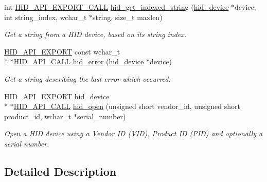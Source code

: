 \begin{DoxyCompactItemize}
int \hyperlink{osx_2hidapi_8h_a70c49eda5025c1bc455af77da19ca312}{H\-I\-D\-\_\-\-A\-P\-I\-\_\-\-E\-X\-P\-O\-R\-T\-\_\-\-C\-A\-L\-L} \hyperlink{group__API_ga03810bc0be3c21e9229feff689a9de85}{hid\-\_\-get\-\_\-indexed\-\_\-string} (\hyperlink{linux_2hidapi_8h_aa6da74d5686d198dd3e5440e60088fcc}{hid\-\_\-device} $\ast$device, int string\-\_\-index, wchar\-\_\-t $\ast$string, size\-\_\-t maxlen)
\begin{DoxyCompactList}\small\item\em Get a string from a H\-I\-D device, based on its string index. \end{DoxyCompactList}\item 
\hyperlink{osx_2hidapi_8h_aa60150016800ccb88fdf140e8553ae13}{H\-I\-D\-\_\-\-A\-P\-I\-\_\-\-E\-X\-P\-O\-R\-T} const wchar\-\_\-t \\*
$\ast$\hyperlink{osx_2hidapi_8h_af140a25716604e86096670a505a58ee0}{H\-I\-D\-\_\-\-A\-P\-I\-\_\-\-C\-A\-L\-L} \hyperlink{group__API_ga1b5c0ca1c785b8024f5eb46750a8f606}{hid\-\_\-error} (\hyperlink{linux_2hidapi_8h_aa6da74d5686d198dd3e5440e60088fcc}{hid\-\_\-device} $\ast$device)
\begin{DoxyCompactList}\small\item\em Get a string describing the last error which occurred. \end{DoxyCompactList}\item 
\hyperlink{osx_2hidapi_8h_aa60150016800ccb88fdf140e8553ae13}{H\-I\-D\-\_\-\-A\-P\-I\-\_\-\-E\-X\-P\-O\-R\-T} \hyperlink{linux_2hidapi_8h_aa6da74d5686d198dd3e5440e60088fcc}{hid\-\_\-device} \\*
$\ast$\hyperlink{osx_2hidapi_8h_af140a25716604e86096670a505a58ee0}{H\-I\-D\-\_\-\-A\-P\-I\-\_\-\-C\-A\-L\-L} \hyperlink{group__API_gabc0f2cd462ee003ce98d2ad3edfeb871}{hid\-\_\-open} (unsigned short vendor\-\_\-id, unsigned short product\-\_\-id, wchar\-\_\-t $\ast$serial\-\_\-number)
\begin{DoxyCompactList}\small\item\em Open a H\-I\-D device using a Vendor I\-D (V\-I\-D), Product I\-D (P\-I\-D) and optionally a serial number. \end{DoxyCompactList}\end{DoxyCompactItemize}


\subsection{Detailed Description}


